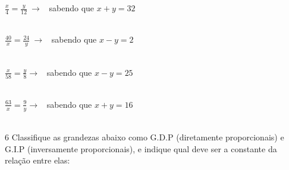 \begin{escolha}

\item $\frac{x}{4} = \frac{y}{12}\  \rightarrow$ \ sabendo que $x + y = 32$ \\

 \\

\item $\frac{40}{x} = \frac{24}{y}\  \rightarrow$ \ sabendo que $x - y = 2$ \\

 \\

\item $\frac{x}{58} = \frac{y}{8} \rightarrow$ \ sabendo que $x - y = 25$ \\

 \\

\item $\frac{63}{x} = \frac{9}{y} \rightarrow$ \ sabendo que $x + y = 16$ \\

 \\

\end{escolha}

\num{6} Classifique as grandezas abaixo como G.D.P (diretamente
proporcionais) e G.I.P (inversamente proporcionais), e indique qual deve
ser a constante da relação entre elas:

